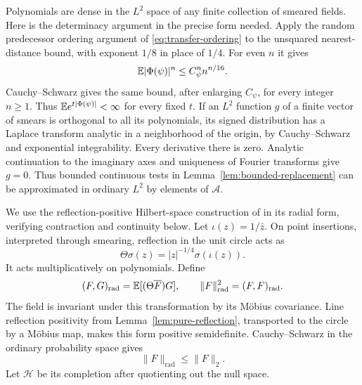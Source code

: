Polynomials are dense in the $L^2$ space of any finite collection of
smeared fields.  Here is the determinacy argument in the precise form
needed.  Apply the random predecessor ordering argument of
\eqref{eq:transfer-ordering} to the unsquared nearest-distance bound,
with exponent $1/8$ in place of $1/4$.  For even $n$ it gives
\[
 \mathbb E|\Phi(\psi)|^n\leq C_\psi^n n^{n/16}.
\]
Cauchy--Schwarz gives the same bound, after enlarging $C_\psi$, for
every integer $n\geq1$.  Thus $\mathbb E e^{t|\Phi(\psi)|}<\infty$ for
every fixed $t$.  If an $L^2$
function $g$ of a finite vector of smears is orthogonal to all its
polynomials, its signed distribution has a Laplace transform analytic in
a neighborhood of the origin, by Cauchy--Schwarz and exponential
integrability.  Every derivative there is zero.  Analytic continuation
to the imaginary axes and uniqueness of Fourier transforms give $g=0$.
Thus bounded continuous tests in Lemma~\ref{lem:bounded-replacement}
can be approximated in ordinary $L^2$ by elements of $\mathcal A$.

We use the reflection-positive Hilbert-space construction of
\citet[Section~4.1]{OsterwalderSchrader1973} in its radial form,
verifying contraction and continuity below.
Let $\iota(z)=1/\bar z$.  On point insertions, interpreted through
smearing, reflection in the unit circle acts as
\[
 \Theta\sigma(z)=|z|^{-1/4}\sigma(\iota(z)).
\]
It acts multiplicatively on polynomials.  Define
\begin{equation}
 (F,G)_{\mathrm{rad}}=\mathbb E[(\Theta\overline F)G],
 \qquad \|F\|_{\mathrm{rad}}^2=(F,F)_{\mathrm{rad}}.
 \label{eq:transfer-radial-form}
\end{equation}
The field is invariant under this transformation by its M\"obius
covariance.  Line reflection positivity from
Lemma~\ref{lem:pure-reflection}, transported to the circle by a
M\"obius map, makes this form positive semidefinite.  Cauchy--Schwarz
in the ordinary probability space gives
\begin{equation}
 \|F\|_{\mathrm{rad}}\leq\|F\|_2.
 \label{eq:transfer-radial-l2}
\end{equation}
Let $\mathcal H$ be its completion after quotienting out the null space.

